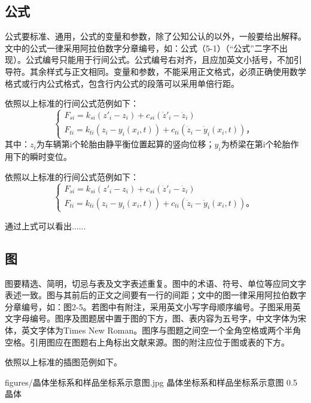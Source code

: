 \subsection{公式}

公式要标准、通用，公式的变量和参数，除了公知公认的以外，一般要给出解释。文中的公式一律采用阿拉伯数字分章编号，如：公式（5-1）（“公式”二字不出现）。公式编号只能用于行间公式。公式编号右对齐，且应加英文小括号，不加引导符。其余样式与正文相同。变量和参数，不能采用正文格式，必须正确使用数学格式或行内公式格式，包含行内公式的段落可以采用单倍行距。

依照以上标准的行间公式范例如下：
\begin{equation}
    \begin{cases}
        F_{si} = k_{si}(z'_i-z_i)+c_{si}(\dot{z}'_i-\dot{z}_i) \\
        F_{ti} = k_{ti}(z_i-y_i(x_i,t))+c_{ti}(\dot{z}_i-\dot{y}_i(x_i,t))\text{，} %
    \end{cases}
    \label{公式逗号}
\end{equation}
其中：$z_i$为车辆第i个轮胎由静平衡位置起算的竖向位移；$y_i$为桥梁在第i个轮胎作用下的瞬时变位。%

依照以上标准的行间公式范例如下：
\begin{equation}
    \begin{cases}
        F_{si} = k_{si}(z'_i-z_i)+c_{si}(\dot{z}'_i-\dot{z}_i) \\
        F_{ti} = k_{ti}(z_i-y_i(x_i,t))+c_{ti}(\dot{z}_i-\dot{y}_i(x_i,t))\text{。} %
    \end{cases}
    \label{公式句号}
\end{equation}

通过上式可以看出......%

\subsection{图}

图要精选、简明，切忌与表及文字表述重复。图中的术语、符号、单位等应同文字表述一致。图与其前后的正文之间要有一行的间距；文中的图一律采用阿拉伯数字分章编号，如：图2-5。若图中有附注，采用英文小写字母顺序编号。子图采用英文字母编号。图序及图题居中置于图的下方，图、表内容为五号字，中文字体为宋体，英文字体为Times New Roman。图序与图题之间空一个全角空格或两个半角空格。引用图应在图题右上角标出文献来源。图的附注应位于图或表的下方。

依照以上标准的插图范例如下。

            {figures/晶体坐标系和样品坐标系示意图.jpg}
            {晶体坐标系和样品坐标系示意图}
            {0.5}
            {晶体}

